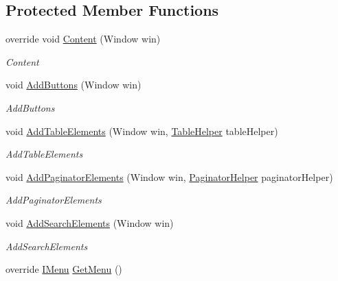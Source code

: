 \subsection*{Protected Member Functions}
\begin{DoxyCompactItemize}
\item 
override void \mbox{\hyperlink{class_gtd_app_1_1_console_1_1_views_1_1_items_1_1_list_items_view_a1033569c645e453ef7b1faf29897684f}{Content}} (Window win)
\begin{DoxyCompactList}\small\item\em Content \end{DoxyCompactList}\item 
void \mbox{\hyperlink{class_gtd_app_1_1_console_1_1_views_1_1_items_1_1_list_items_view_af47a989ad448b41d13630ac6fc499a79}{Add\+Buttons}} (Window win)
\begin{DoxyCompactList}\small\item\em Add\+Buttons \end{DoxyCompactList}\item 
void \mbox{\hyperlink{class_gtd_app_1_1_console_1_1_views_1_1_items_1_1_list_items_view_aba69c44b20e42f5e751feb9beed70691}{Add\+Table\+Elements}} (Window win, \mbox{\hyperlink{class_gtd_app_1_1_console_core_1_1_views_1_1_helpers_1_1_table_helper}{Table\+Helper}} table\+Helper)
\begin{DoxyCompactList}\small\item\em Add\+Table\+Elements \end{DoxyCompactList}\item 
void \mbox{\hyperlink{class_gtd_app_1_1_console_1_1_views_1_1_items_1_1_list_items_view_a0caea127ed8771e3dac2e88a0b3332a0}{Add\+Paginator\+Elements}} (Window win, \mbox{\hyperlink{class_gtd_app_1_1_console_core_1_1_views_1_1_helpers_1_1_paginator_helper}{Paginator\+Helper}} paginator\+Helper)
\begin{DoxyCompactList}\small\item\em Add\+Paginator\+Elements \end{DoxyCompactList}\item 
void \mbox{\hyperlink{class_gtd_app_1_1_console_1_1_views_1_1_items_1_1_list_items_view_aab42f719dacf268d13fc73792e2edf5b}{Add\+Search\+Elements}} (Window win)
\begin{DoxyCompactList}\small\item\em Add\+Search\+Elements \end{DoxyCompactList}\item 
override \mbox{\hyperlink{interface_gtd_app_1_1_console_core_1_1_menu_1_1_i_menu}{I\+Menu}} \mbox{\hyperlink{class_gtd_app_1_1_console_1_1_views_1_1_items_1_1_list_items_view_a0abb0cf4929790758e9178e93b2935e6}{Get\+Menu}} ()

\end{DoxyCompactItemize}
